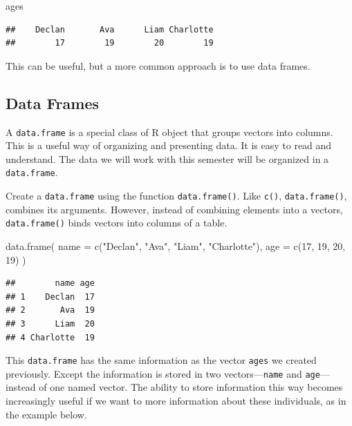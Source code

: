 \documentclass[
]{book}
\newenvironment{Shaded}{\begin{snugshade}}{\end{snugshade}}
\newcommand{\AttributeTok}[1]{\textcolor[rgb]{0.77,0.63,0.00}{#1}}
\newcommand{\DecValTok}[1]{\textcolor[rgb]{0.00,0.00,0.81}{#1}}
\newcommand{\FunctionTok}[1]{\textcolor[rgb]{0.00,0.00,0.00}{#1}}
\newcommand{\NormalTok}[1]{#1}
\newcommand{\StringTok}[1]{\textcolor[rgb]{0.31,0.60,0.02}{#1}}
\begin{document}
\begin{Shaded}
\begin{Highlighting}[]
\NormalTok{ages}
\end{Highlighting}
\end{Shaded}

\begin{verbatim}
##    Declan       Ava      Liam Charlotte 
##        17        19        20        19
\end{verbatim}

This can be useful, but a more common approach is to use data frames.

\hypertarget{data-frames}{%
\subsection{Data Frames}\label{data-frames}}

A \texttt{data.frame} is a special class of R object that groups vectors into columns. This is a useful way of organizing and presenting data. It is easy to read and understand. The data we will work with this semester will be organized in a \texttt{data.frame}.

Create a \texttt{data.frame} using the function \texttt{data.frame()}. Like \texttt{c()}, \texttt{data.frame()}, combines its arguments. However, instead of combining elements into a vectors, \texttt{data.frame()} binds vectors into columns of a table.

\begin{Shaded}
\begin{Highlighting}[]
\FunctionTok{data.frame}\NormalTok{(}
  \AttributeTok{name =} \FunctionTok{c}\NormalTok{(}\StringTok{"Declan"}\NormalTok{, }\StringTok{"Ava"}\NormalTok{, }\StringTok{"Liam"}\NormalTok{, }\StringTok{"Charlotte"}\NormalTok{),}
  \AttributeTok{age =} \FunctionTok{c}\NormalTok{(}\DecValTok{17}\NormalTok{, }\DecValTok{19}\NormalTok{, }\DecValTok{20}\NormalTok{, }\DecValTok{19}\NormalTok{)}
\NormalTok{)}
\end{Highlighting}
\end{Shaded}

\begin{verbatim}
##        name age
## 1    Declan  17
## 2       Ava  19
## 3      Liam  20
## 4 Charlotte  19
\end{verbatim}

This \texttt{data.frame} has the same information as the vector \texttt{ages} we created previously. Except the information is stored in two vectors---\texttt{name} and \texttt{age}---instead of one named vector. The ability to store information this way becomes increasingly useful if we want to more information about these individuals, as in the example below.
\end{document}
